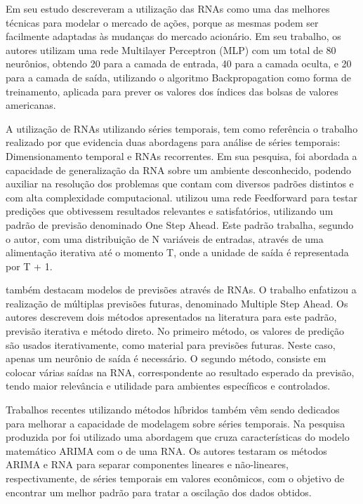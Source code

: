 Em seu estudo  descreveram a utilização das RNAs como uma das melhores técnicas para modelar o mercado de ações, porque as mesmas podem ser facilmente adaptadas às mudanças do mercado acionário. Em seu trabalho, os autores utilizam uma rede Multilayer Perceptron (MLP) com um total de 80 neurônios, obtendo 20 para a camada de entrada, 40 para a camada oculta, e 20 para a camada de saída, utilizando o algoritmo Backpropagation como forma de treinamento, aplicada para prever os valores dos índices das bolsas de valores americanas.

A utilização de RNAs utilizando séries temporais, tem como referência o trabalho realizado por  que evidencia duas abordagens para análise de séries temporais: Dimensionamento temporal e RNAs recorrentes. Em sua pesquisa, foi abordada a capacidade de generalização da RNA sobre um ambiente desconhecido, podendo auxiliar na resolução dos problemas que contam com diversos padrões distintos e com alta complexidade computacional.  utilizou uma rede Feedforward para testar predições que obtivessem resultados relevantes e satisfatórios, utilizando um padrão de previsão denominado One Step Ahead. Este padrão trabalha, segundo o autor, com uma distribuição de  N variáveis de entradas, através de uma alimentação iterativa até o momento T, onde a unidade de saída é representada por T + 1.

 também destacam modelos de previsões através de RNAs. O trabalho enfatizou a realização de múltiplas previsões futuras, denominado Multiple Step Ahead. Os autores descrevem dois métodos apresentados na literatura para  este padrão, previsão iterativa e método direto. No primeiro método, os  valores de predição são usados iterativamente, como material para previsões futuras. Neste caso, apenas um neurônio de saída é necessário. O segundo método, consiste em colocar várias saídas na RNA, correspondente ao resultado esperado da previsão, tendo maior  relevância e utilidade  para ambientes específicos e controlados.

Trabalhos recentes utilizando métodos híbridos também vêm sendo dedicados para melhorar a capacidade de modelagem sobre séries temporais. Na pesquisa produzida por  foi utilizado uma abordagem que cruza características do modelo matemático ARIMA com o de uma RNA. Os autores testaram os métodos ARIMA e RNA para separar componentes lineares e não-lineares, respectivamente, de séries temporais em valores econômicos, com o objetivo de encontrar um melhor padrão para tratar a oscilação dos dados obtidos.

